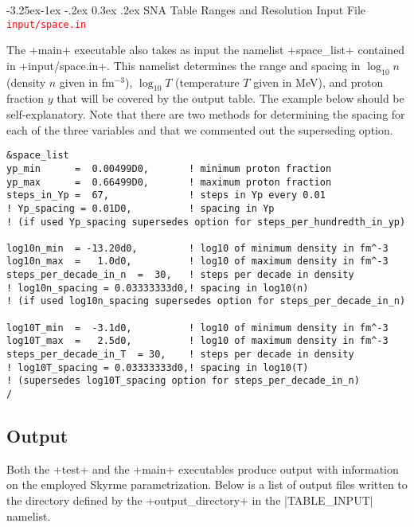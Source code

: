 \documentclass[letterpaper,11pt]{refart}
\makeatletter
\renewcommand\subsubsection{\@startsection{subsubsection}{3}{\z@}%
                           {-3.25ex\@plus -1ex \@minus -.2ex}%
                           {0.3ex \@plus .2ex}%
                           {\normalfont\normalsize\bf\fontsize{11}{13}\selectfont}}
\makeatother
\begin{document}
\subsubsection{SNA Table Ranges and Resolution Input File \textcolor{red}{\texttt{input/space.in}}}\label{sssec:SNA_phase_space_in}


The \verbexec+main+ executable also takes as input the namelist
\verbnml+space_list+ contained in
\verbfile+input/space.in+.  This namelist determines the range and spacing in $\log_{10}n$ (density $n$ given in fm$^{-3}$),
$\log_{10}T$ (temperature $T$ given in MeV), and proton fraction $y$
that will be covered by the output table.  The example below should be
self-explanatory.  Note that there are two methods for determining the
spacing for each of the three variables and that we commented out the
superseding option.

{\color{cyan}
\begin{verbatim}
&space_list
yp_min      =  0.00499D0,       ! minimum proton fraction
yp_max      =  0.66499D0,       ! maximum proton fraction
steps_in_Yp =  67,              ! steps in Yp every 0.01
! Yp_spacing = 0.01D0,          ! spacing in Yp 
! (if used Yp_spacing supersedes option for steps_per_hundredth_in_yp)

log10n_min  = -13.20d0,         ! log10 of minimum density in fm^-3
log10n_max  =   1.0d0,          ! log10 of maximum density in fm^-3
steps_per_decade_in_n  =  30,   ! steps per decade in density
! log10n_spacing = 0.03333333d0,! spacing in log10(n) 
! (if used log10n_spacing supersedes option for steps_per_decade_in_n)

log10T_min  =  -3.1d0,          ! log10 of minimum density in fm^-3
log10T_max  =   2.5d0,          ! log10 of maximum density in fm^-3
steps_per_decade_in_T  = 30,    ! steps per decade in density
! log10T_spacing = 0.03333333d0,! spacing in log10(T) 
! (supersedes log10T_spacing option for steps_per_decade_in_n)
/
\end{verbatim}}



\subsection{Output}\label{ssec:SNA_out}


Both the \verbexec+test+ and the \verbexec+main+ executables produce
output with information on the employed Skyrme parametrization. Below
is a list of output files written to the directory defined by the
\verbfile+output_directory+ in the \verbnml|TABLE_INPUT| namelist.
\end{document}
